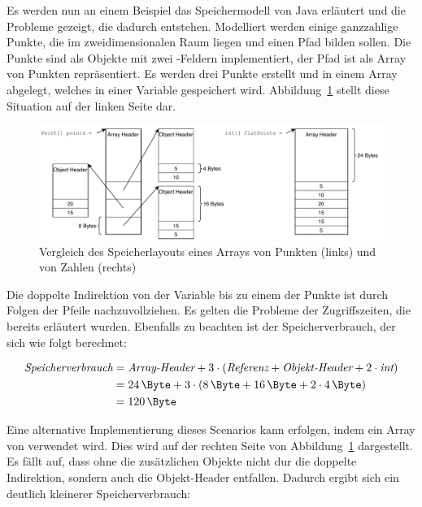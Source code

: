 Es werden nun an einem Beispiel das Speichermodell von Java erläutert und die Probleme gezeigt, die dadurch entstehen.
Modelliert werden einige ganzzahlige Punkte, die im zweidimensionalen Raum liegen und einen Pfad bilden sollen.
Die Punkte sind als Objekte mit zwei -Feldern implementiert, der Pfad ist als Array von Punkten repräsentiert.
Es werden drei Punkte erstellt und in einem Array abgelegt, welches in einer Variable gespeichert wird.
Abbildung~\ref{fig:memory-usage} stellt diese Situation auf der linken Seite dar.

\begin{figure}[htp]
    \centering
    \includegraphics[width=\textwidth]{img/memory-usage.pdf}
    \vspace{-3ex}
    \caption{Vergleich des Speicherlayouts eines Arrays von Punkten (links) und von Zahlen (rechts)}
    \label{fig:memory-usage}
\end{figure}

Die doppelte Indirektion von der Variable bis zu einem der Punkte ist durch Folgen der Pfeile nachzuvollziehen.
Es gelten die Probleme der Zugriffszeiten, die bereits erläutert wurden.
Ebenfalls zu beachten ist der Speicherverbrauch, der sich wie folgt berechnet:

\begin{equation}
    \begin{split}
        \textit{Speicherverbrauch} & = \textit{Array-Header} + 3 \cdot (\textit{Referenz} + \textit{Objekt-Header} + 2 \cdot \textit{int}) \\
        & = \SI{24}{\Byte} + 3 \cdot (\SI{8}{\Byte} + \SI{16}{\Byte} + 2 \cdot \SI{4}{\Byte}) \\
        & = \SI{120}{\Byte}\label{eq:memory-usage-current} \\
    \end{split}
\end{equation}

Eine alternative Implementierung dieses Scenarios kann erfolgen, indem ein Array von  verwendet wird.
Dies wird auf der rechten Seite von Abbildung~\ref{fig:memory-usage} dargestellt.
Es fällt auf, dass ohne die zusätzlichen Objekte nicht dur die doppelte Indirektion, sondern auch die Objekt-Header entfallen.
Dadurch ergibt sich ein deutlich kleinerer Speicherverbrauch:

